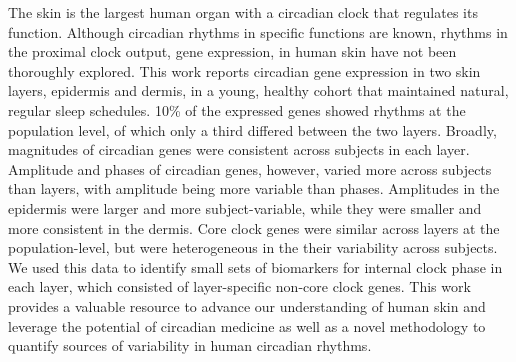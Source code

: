 The skin is the largest human organ with a circadian clock that regulates its function. Although circadian rhythms in specific functions are known, rhythms in the proximal clock output, gene expression, in human skin have not been thoroughly explored. This work reports circadian gene expression in two skin layers, epidermis and dermis, in a young, healthy cohort that maintained natural, regular sleep schedules. 10\% of the expressed genes showed rhythms at the population level, of which only a third differed between the two layers. Broadly, magnitudes of circadian genes were consistent across subjects in each layer. Amplitude and phases of circadian genes, however, varied more across subjects than layers, with amplitude being more variable than phases. Amplitudes in the epidermis were larger and more subject-variable, while they were smaller and more consistent in the dermis. Core clock genes were similar across layers at the population-level, but were heterogeneous in the their variability across subjects. We used this data to identify small sets of biomarkers for internal clock phase in each layer, which consisted of layer-specific non-core clock genes. This work provides a valuable resource to advance our understanding of human skin and leverage the potential of circadian medicine as well as a novel methodology to quantify sources of variability in human circadian rhythms.



